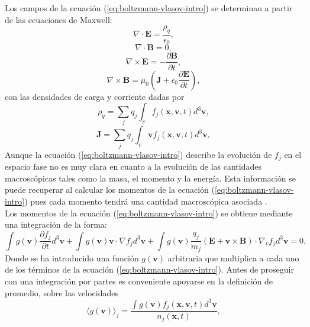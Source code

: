 \documentclass[../tesis_main_file.tex]{subfiles}
\begin{document}
Los campos de la ecuación (\ref{eq:boltzmann-vlasov-intro}) se determinan a partir de las ecuaciones de Maxwell:
\begin{equation}
\nabla \cdot \textbf{E}=\frac{\rho_q}{\epsilon _0},
\end{equation}
\begin{equation}
\nabla \cdot \textbf{B}=0,
\end{equation}
\begin{equation}
\nabla \times \textbf{E}=-\frac{\partial \textbf{B}}{\partial t},
\end{equation}
\begin{equation}
\nabla \times \textbf{B} = \mu _0 \left(\textbf{J}+\epsilon_0\frac{\partial \textbf{E}}{\partial t} \right),
\end{equation}
con las densidades de carga y corriente dadas por
\begin{equation}
\rho_q = \sum_j q_j \int_v f_j(\textbf{x},\textbf{v},t) d^3 \textbf{v},
\end{equation}
\begin{equation}
\textbf{J}= \sum_j q_j \int_v \textbf{v}f_j(\textbf{x},\textbf{v},t) d^3 \textbf{v},
\end{equation}
Aunque la ecuación (\ref{eq:boltzmann-vlasov-intro}) describe la evolución de $f_j$ en el espacio fase no es muy clara en cuanto a la evolución de las cantidades macroscópicas tales como la masa, el momento y la energía.
Esta información se puede recuperar al calcular los momentos de la ecuación (\ref{eq:boltzmann-vlasov-intro}) pues cada momento tendrá una cantidad macroscópica asociada .\\
Los momentos de la ecuación (\ref{eq:boltzmann-vlasov-intro}) se obtiene mediante una integración de la forma:
\begin{equation}
    \label{eq:Boltzmann-g}
     \int g(\textbf{v})\frac{\partial f_j}{\partial t}d^3 \textbf{v}+ \int g(\textbf{v})\textbf{v}\cdot \nabla f_j d^3 \textbf{v} + \int g(\textbf{v})\frac{q_j}{m_j}\left( \textbf{E} + \textbf{v} \times \textbf{B}\right)\cdot \nabla _v f_j d^3 \textbf{v}=0.
\end{equation}
Donde se ha introducido una función $g(\textbf{v})$ arbitraria que multiplica a cada uno de los términos de la ecuación (\ref{eq:boltzmann-vlasov-intro}). Antes de proseguir con una integración por partes es conveniente apoyarse en la definición de promedio, sobre las velocidades
\begin{equation}
    \label{eq:promedio_g_def}
    \langle g(\textbf{v}) \rangle _j = \frac{\int g(\textbf{v})f_j(\textbf{x},\textbf{v},t)d^3\textbf{v}}{n_j(\textbf{x},t)},
\end{equation}
\end{document}
